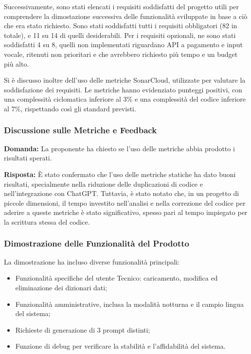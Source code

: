 \par Successivamente, sono stati elencati i requisiti soddisfatti del progetto utili per comprendere la dimostazione successiva delle funzionalità sviluppate in base a ciò che era stato richiesto. Sono stati soddisfatti tutti i requisiti obbligatori (82 in totale), e  11 su 14 di quelli desiderabili. Per i requisiti opzionali, ne sono stati soddisfatti 4 su 8, quelli non implementati riguardano API a pagamento e input vocale, ritenuti non prioritari e che avrebbero richiesto più tempo e un budget più alto.

\par Si è discusso inoltre dell'uso delle metriche SonarCloud, utilizzate per valutare la soddisfazione dei requisiti. Le metriche hanno evidenziato punteggi positivi, con una complessità ciclomatica inferiore al 3\% e una complessità del codice inferiore al 7\%, rispettando così gli standard previsti.

\subsubsection{Discussione sulle Metriche e Feedback}

\par \textbf{Domanda:} La proponente ha chiesto se l'uso delle metriche abbia prodotto i risultati sperati.

\par \textbf{Risposta:} È stato confermato che l'uso delle metriche statiche ha dato buoni risultati, specialmente nella riduzione delle duplicazioni di codice e nell'integrazione con ChatGPT. Tuttavia, è stato notato che, in un progetto di piccole dimensioni, il tempo investito nell'analisi e nella correzione del codice per aderire a queste metriche è stato significativo, spesso pari al tempo impiegato per la scrittura stessa del codice.

\subsubsection{Dimostrazione delle Funzionalità del Prodotto}

\par La dimostrazione ha incluso diverse funzionalità principali:
\begin{itemize}
    \item Funzionalità specifiche del utente Tecnico: caricamento, modifica ed eliminazione dei dizionari dati;
    \item Funzionalità amministrative, inclusa la modalità notturna e il campio lingua del sistema;
    \item Richieste di generazione di 3 prompt distinti; 
    \item Funzione di debug per verificare la stabilità e l'affidabilità del sistema.
\end{itemize}

